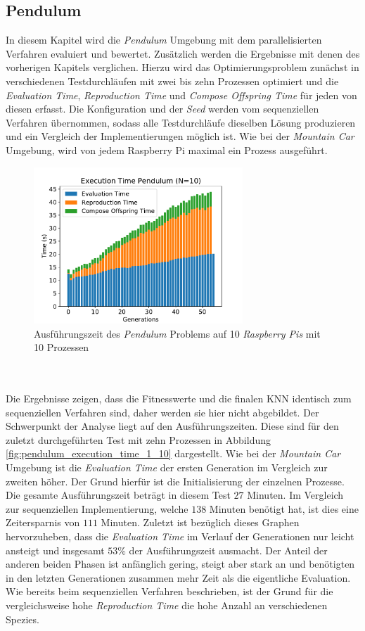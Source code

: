 \subsection{Pendulum}
In diesem Kapitel wird die \emph{Pendulum} Umgebung mit dem parallelisierten Verfahren evaluiert und bewertet. Zusätzlich werden die Ergebnisse mit denen des vorherigen Kapitels verglichen. Hierzu wird das Optimierungsproblem zunächst in verschiedenen Testdurchläufen mit zwei bis zehn Prozessen optimiert und die \emph{Evaluation Time}, \emph{Reproduction Time} und \emph{Compose Offspring Time} für jeden von diesen erfasst. Die Konfiguration und der \emph{Seed} werden vom sequenziellen Verfahren übernommen, sodass alle Testdurchläufe dieselben Lösung produzieren und ein Vergleich der Implementierungen möglich ist. Wie bei der \emph{Mountain Car} Umgebung, wird von jedem Raspberry Pi maximal ein Prozess ausgeführt. 
\begin{figure}[!htb]
	\centering
	\includegraphics[width=0.7\textwidth]{./img/pendulum_analysis/pendulum_time_1_10core_10pi.pdf} 
	\caption{Ausführungszeit des \emph{Pendulum} Problems auf 10 \emph{Raspberry Pis} mit 10 Prozessen}
	\label{fig:pendulum_time_10cores_10pi}
\end{figure}
\\\\
Die Ergebnisse zeigen, dass die Fitnesswerte und die finalen \ac{KNN} identisch zum sequenziellen Verfahren sind, daher werden sie hier nicht abgebildet. Der Schwerpunkt der Analyse liegt auf den Ausführungszeiten. Diese sind für den zuletzt durchgeführten Test mit zehn Prozessen in Abbildung \ref{fig:pendulum_execution_time_1_10} dargestellt. Wie bei der \emph{Mountain Car} Umgebung ist die \emph{Evaluation Time} der ersten Generation im Vergleich zur zweiten höher. Der Grund hierfür ist die Initialisierung der einzelnen Prozesse.  Die gesamte Ausführungszeit beträgt in diesem Test $27$ Minuten. Im Vergleich zur sequenziellen Implementierung, welche $138$ Minuten benötigt hat, ist dies eine Zeitersparnis von $111$ Minuten. Zuletzt ist bezüglich dieses Graphen hervorzuheben, dass die \emph{Evaluation Time} im Verlauf der Generationen nur leicht ansteigt und insgesamt $53\%$ der Ausführungszeit ausmacht. Der Anteil der anderen beiden Phasen ist anfänglich gering, steigt aber stark an und benötigten in den letzten Generationen zusammen mehr Zeit als die eigentliche Evaluation. Wie bereits beim sequenziellen Verfahren beschrieben, ist der Grund für die vergleichsweise hohe \emph{Reproduction Time} die hohe Anzahl an verschiedenen Spezies. 
